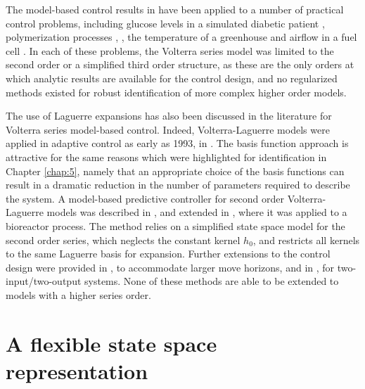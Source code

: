 The model-based control results in \cite{Doyle1995} have been applied to a number of practical control problems, including glucose levels in a simulated diabetic patient \cite{Rubb2004}, polymerization processes \cite{Maner1996}, \cite{Li2005}, the temperature of a greenhouse \cite{Gruber2011} and airflow in a fuel cell \cite{Gruber2012}. In each of these problems, the Volterra series model was limited to the second order or a simplified third order structure, as these are the only orders at which analytic results are available for the control design, and no regularized methods existed for robust identification of more complex higher order models. 

The use of Laguerre expansions has also been discussed in the literature for Volterra series model-based control. Indeed, Volterra-Laguerre models were applied in adaptive control as early as 1993, in \cite{Dumont1993}. The basis function approach is attractive for the same reasons which were highlighted for identification in Chapter \ref{chap:5}, namely that an appropriate choice of the basis functions can result in a dramatic reduction in the number of parameters required to describe the system. A model-based predictive controller for second order Volterra-Laguerre models was described in \cite{Dumont1994}, and extended in \cite{Parker1998}, where it was applied to a bioreactor process. The method relies on a simplified state space model for the second order series, which neglects the constant kernel $h_0$, and restricts all kernels to the same Laguerre basis for expansion. Further extensions to the control design were provided in \cite{Parker2002}, to accommodate larger move horizons, and in \cite{Antoine2006}, for two-input/two-output systems. None of these methods are able to be extended to models with a higher series order. 

\section{A flexible state space representation}

